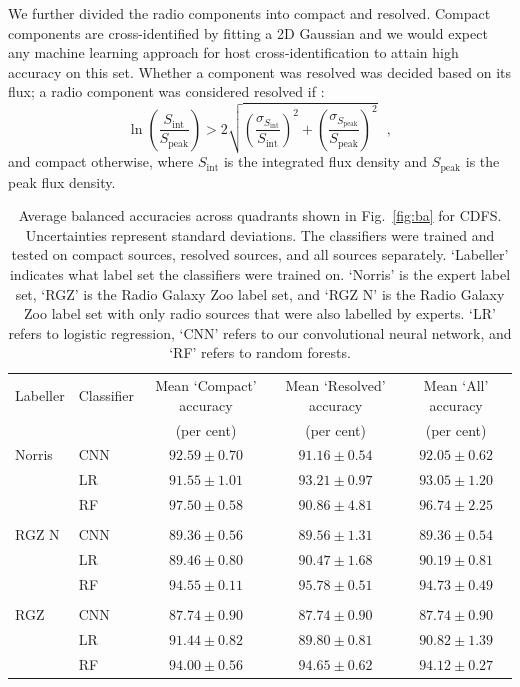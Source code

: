 \documentclass[fleqn,usenatbib,usedcolumn]{mnras}
\begin{document}
    We further divided the radio components into compact and resolved. Compact
    components are cross-identified by fitting a 2D Gaussian \citep[as
    in][]{norris06} and we would expect any machine learning approach for host
    cross-identification to attain high accuracy on this set. Whether a
    component was resolved was decided based on its flux; a radio component was
    considered resolved if \citep{franzen15}:
    \begin{equation}
        \ln \left(
          \frac{S_{\text{int}}}
               {S_{\text{peak}}}
        \right) > 2\sqrt{\left(
          \frac{\sigma_{S_{\text{int}}}}
               {S_{\text{int}}}
        \right)^2 + \left(
          \frac{\sigma_{S_{\text{peak}}}}
               {S_{\text{peak}}}
        \right)^2}\,\,\,\,,
    \end{equation}%
    and compact otherwise, where \(S_{\text{int}}\) is the integrated flux
    density and \(S_{\text{peak}}\) is the peak flux density.

  \begin{table}
    \caption{Average balanced accuracies across quadrants shown in Fig.~\ref{fig:ba} for CDFS.
      Uncertainties represent standard deviations.
      The classifiers were trained and tested on compact sources, resolved sources, and all
      sources separately. `Labeller' indicates what label set the classifiers were trained
      on. `Norris' is the expert label set, `RGZ' is the Radio Galaxy Zoo label
      set, and `RGZ N' is the Radio Galaxy Zoo label set with only radio sources
      that were also labelled by experts. `LR' refers to
      logistic regression, `CNN' refers to our convolutional neural network, and
      `RF' refers to random forests.}
    \label{ba:average-accuracies}
    \begin{tabular}{llccc}
\hline
Labeller & Classifier & Mean `Compact' accuracy & Mean `Resolved' accuracy & Mean `All' accuracy\\
 & & (per cent) & (per cent) & (per cent)\\
\hline
Norris & CNN & $92.59 \pm 0.70$ & $91.16 \pm 0.54$ & $92.05 \pm 0.62$\\
 & LR & $91.55 \pm 1.01$ & $93.21 \pm 0.97$ & $93.05 \pm 1.20$\\
 & RF & $97.50 \pm 0.58$ & $90.86 \pm 4.81$ & $96.74 \pm 2.25$\\
 \\
RGZ N & CNN & $89.36 \pm 0.56$ & $89.56 \pm 1.31$ & $89.36 \pm 0.54$\\
 & LR & $89.46 \pm 0.80$ & $90.47 \pm 1.68$ & $90.19 \pm 0.81$\\
 & RF & $94.55 \pm 0.11$ & $95.78 \pm 0.51$ & $94.73 \pm 0.49$\\
 \\
RGZ & CNN & $87.74 \pm 0.90$ & $87.74 \pm 0.90$ & $87.74 \pm 0.90$\\
 & LR & $91.44 \pm 0.82$ & $89.80 \pm 0.81$ & $90.82 \pm 1.39$\\
 & RF & $94.00 \pm 0.56$ & $94.65 \pm 0.62$ & $94.12 \pm 0.27$\\
\hline
\end{tabular}
\end{table}
\end{document}
